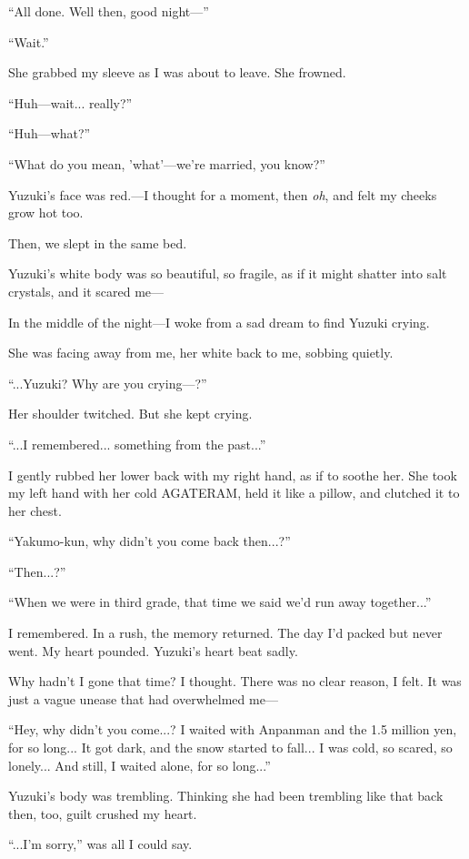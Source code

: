 \documentclass[
    a4paper,
    12pt,
    twoside,
    openany,
    UTF8,
    fontset=windows
]{ctexbook}
\begin{document}
``All done. Well then, good night---''

``Wait.''

She grabbed my sleeve as I was about to leave. She frowned.

``Huh---wait... really?''

``Huh---what?''

``What do you mean, 'what'---we're married, you know?''

Yuzuki's face was red.---I thought for a moment, then \emph{oh}, and felt my cheeks grow hot too.

Then, we slept in the same bed.

Yuzuki's white body was so beautiful, so fragile, as if it might shatter into salt crystals, and it scared me---

In the middle of the night---I woke from a sad dream to find Yuzuki crying.

She was facing away from me, her white back to me, sobbing quietly.

``...Yuzuki? Why are you crying---?''

Her shoulder twitched. But she kept crying.

``...I remembered... something from the past...''

I gently rubbed her lower back with my right hand, as if to soothe her. She took my left hand with her cold AGATERAM, held it like a pillow, and clutched it to her chest.

``Yakumo-kun, why didn't you come back then...?''

``Then...?''

``When we were in third grade, that time we said we'd run away together...''

I remembered. In a rush, the memory returned. The day I'd packed but never went. My heart pounded. Yuzuki's heart beat sadly.

Why hadn't I gone that time? I thought. There was no clear reason, I felt. It was just a vague unease that had overwhelmed me---

``Hey, why didn't you come...? I waited with Anpanman and the 1.5 million yen, for so long... It got dark, and the snow started to fall... I was cold, so scared, so lonely... And still, I waited alone, for so long...''

Yuzuki's body was trembling. Thinking she had been trembling like that back then, too, guilt crushed my heart.

``...I'm sorry,'' was all I could say.
\end{document}
